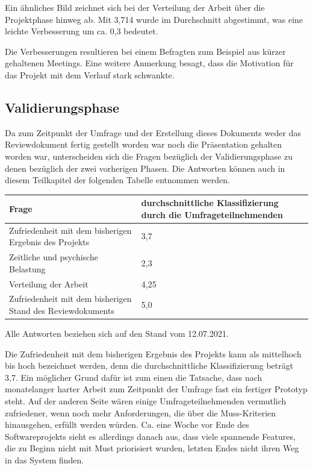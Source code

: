 \documentclass[../review_3.tex]{subfiles}
\begin{document}
Ein ähnliches Bild zeichnet sich bei der Verteilung der Arbeit über die Projektphase hinweg ab. Mit 3,714 wurde im Durchschnitt abgestimmt, was eine leichte Verbesserung um ca. 0,3 bedeutet.

Die Verbesserungen resultieren bei einem Befragten zum Beispiel aus kürzer gehaltenen Meetings. Eine weitere Anmerkung besagt, dass die Motivation für das Projekt mit dem Verlauf stark schwankte.

\subsection{Validierungsphase} %

Da zum Zeitpunkt der Umfrage und der Erstellung dieses Dokuments weder das Reviewdokument fertig gestellt worden war noch die Präsentation gehalten worden war, unterscheiden sich die Fragen bezüglich der Validierungsphase zu denen bezüglich der zwei vorherigen Phasen. Die Antworten können auch in diesem Teilkapitel der folgenden Tabelle entnommen werden.

\begin{tabular}[t]{p{} p{}}
    \toprule
   \textbf{Frage} & \textbf{durchschnittliche Klassifizierung durch die Umfrageteilnehmenden}\\ \midrule 
    Zufriedenheit mit dem bisherigen Ergebnis des Projekts & 3,7\\
    Zeitliche und psychische Belastung & 2,3 \\
    Verteilung der Arbeit & 4,25 \\
    Zufriedenheit mit dem bisherigen Stand des Reviewdokuments & 5,0 \\
    \bottomrule
\end{tabular}

Alle Antworten beziehen sich auf den Stand vom 12.07.2021.

Die Zufriedenheit mit dem bisherigen Ergebnis des Projekts kann als mittelhoch bis hoch bezeichnet werden, denn die durchschnittliche Klassifizierung beträgt 3,7. Ein möglicher Grund dafür ist zum einen die Tatsache, dass nach monatelanger harter Arbeit zum Zeitpunkt der Umfrage fast ein fertiger Prototyp steht. Auf der anderen Seite wären einige Umfrageteilnehmenden vermutlich zufriedener, wenn noch mehr Anforderungen, die über die Muss-Kriterien hinausgehen, erfüllt werden würden. Ca. eine Woche vor Ende des Softwareprojekts sieht es allerdings danach aus, dass viele spannende Features, die zu Beginn nicht mit Must priorisiert wurden, letzten Endes nicht ihren Weg in das System finden.
\end{document}

